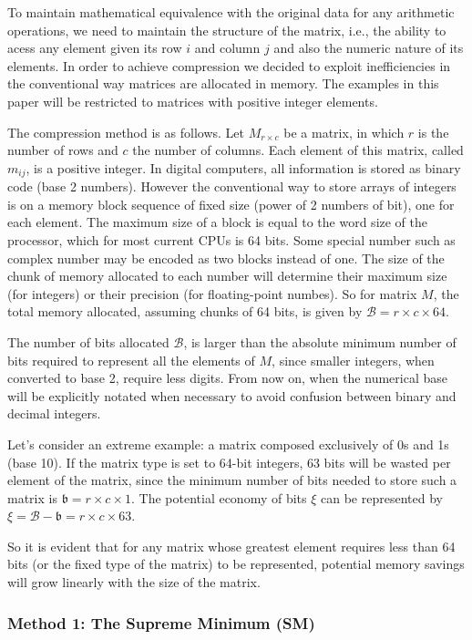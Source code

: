\documentclass[10pt]{article}
\begin{document}
To maintain mathematical equivalence with the original data for any arithmetic operations, we need to  maintain the structure of the matrix, i.e., the ability to acess any element given its row $i$ and column $j$ and also the numeric nature of its elements. In order to achieve compression we decided to exploit inefficiencies in the conventional way matrices are allocated in memory. The examples in this paper will be restricted to matrices with positive integer elements.

The compression method is as follows. Let $M_{r \times c}$ be a matrix, in which $r$ is the number of rows and $c$ the number of columns. Each element of this matrix, called $m_{ij}$, is a positive integer. In digital computers, all information is stored as binary code (base 2 numbers). However the conventional way to store arrays of integers is on a memory block sequence of fixed size (power of 2 numbers of bit), one for each element. The maximum size of a block is equal to the word size of the processor, which for most current CPUs is 64 bits. Some special number such as complex number may be encoded as two blocks instead of one. The size of the chunk of memory allocated to each number will determine their maximum  size (for integers) or their precision (for floating-point numbes). So for matrix $M$, the total memory allocated, assuming chunks of 64 bits, is given by $\mathcal{B} = r \times c \times 64$.

The number of bits allocated $\mathcal{B}$, is larger than the absolute minimum number of bits required to represent all the elements of $M$, since smaller integers, when converted to base 2, require less digits. From now on, when the numerical base will be explicitly notated when necessary to avoid confusion between binary and decimal integers.  

Let's consider an extreme example: a matrix composed exclusively of 0s and 1s (base 10). If the matrix type is set to 64-bit integers, 63 bits will be wasted per element of the matrix, since the minimum number of bits needed to store such a matrix is $\mathfrak{b} = r \times c \times 1$. The potential economy of bits $\xi$ can be represented by $\xi = \mathcal{B} - \mathfrak{b} =  r \times c \times 63$.


So it is evident that for any matrix whose greatest element requires less than 64 bits (or the fixed type of the matrix) to be represented, potential memory savings will grow linearly with the size of the matrix.

\subsubsection*{Method 1: The Supreme Minimum (SM)}
\end{document}
